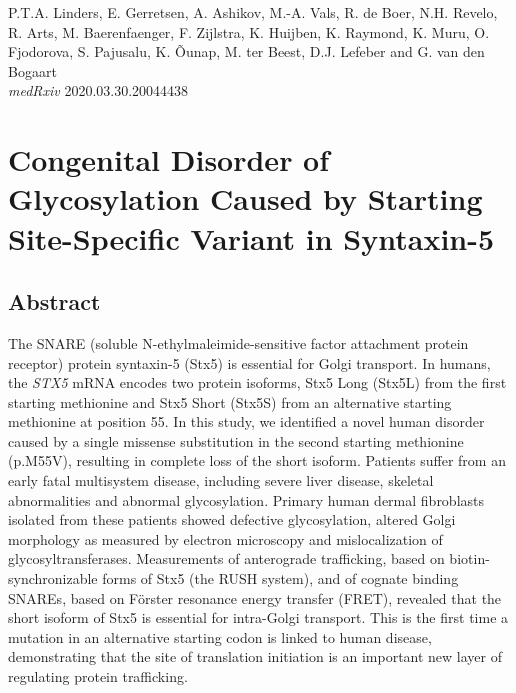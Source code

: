 
\stopthumb




\thispagestyle{empty}
\begin{savequote}
    \normalfont\normalsize{P.T.A. Linders, E. Gerretsen, A. Ashikov, M.-A. Vals, R. de Boer, \newline N.H. Revelo, R. Arts, M. Baerenfaenger, F. Zijlstra, K. Huijben, \newline K. Raymond, K. Muru, O. Fjodorova, S. Pajusalu, K. Õunap, \newline M. ter Beest, D.J. Lefeber and G. van den Bogaart\\
        \emph{medRxiv} 2020.03.30.20044438}
\end{savequote}
\chapter{Congenital Disorder of Glycosylation Caused by Starting Site-Specific Variant in Syntaxin-5}

\thispagestyle{empty}

\clearpage

\continuethumb
\section{Abstract}

The SNARE (soluble N-ethylmaleimide-sensitive factor attachment protein receptor) protein syntaxin-5 (Stx5) is essential for Golgi transport. In humans, the \emph{STX5} mRNA encodes two protein isoforms, Stx5 Long (Stx5L) from the first starting methionine and Stx5 Short (Stx5S) from an alternative starting methionine at position 55. In this study, we identified a novel human disorder caused by a single missense substitution in the second starting methionine (p.M55V), resulting in complete loss of the short isoform. Patients suffer from an early fatal multisystem disease, including severe liver disease, skeletal abnormalities and abnormal glycosylation. Primary human dermal fibroblasts isolated from these patients showed defective glycosylation, altered Golgi morphology as measured by electron microscopy and mislocalization of glycosyltransferases. Measurements of anterograde trafficking, based on biotin-synchronizable forms of Stx5 (the RUSH system), and of cognate binding SNAREs, based on Förster resonance energy transfer (FRET), revealed that the short isoform of Stx5 is essential for intra-Golgi transport. This is the first time a mutation in an alternative starting codon is linked to human disease, demonstrating that the site of translation initiation is an important new layer of regulating protein trafficking.
\clearpage

